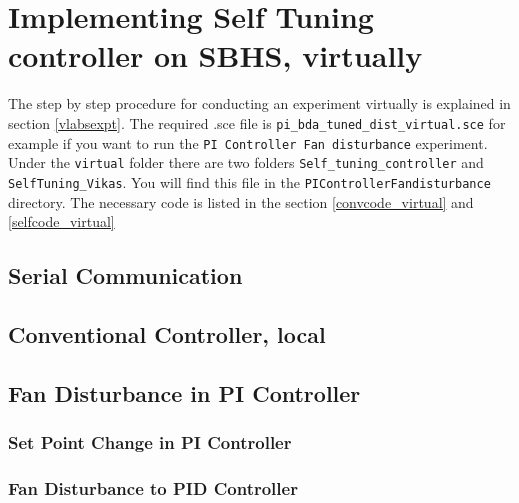 \section{Implementing Self Tuning controller on SBHS, virtually}
The step by step procedure for conducting an experiment virtually is explained in section \ref{vlabsexpt}. The required .sce file is {\tt pi\_bda\_tuned\_dist\_virtual.sce} for example if you want to run the {\tt PI Controller Fan disturbance} experiment.  Under the {\tt virtual} folder there are two folders {\tt Self\_tuning\_controller} and {\tt SelfTuning\_Vikas}. You will find this file in the {\tt PIControllerFandisturbance} directory. The necessary code is listed in the section \ref{convcode_virtual} and \ref{selfcode_virtual}


\subsection{Serial Communication}
\begin{code}

\end{code}


\subsection{Conventional Controller, local}\label{convcode_local}
\subsection{Fan Disturbance in PI Controller}
\begin{code}

\end{code}


\subsubsection{Set Point Change in PI Controller}
\begin{code}

\end{code}



\subsubsection{Fan Disturbance to PID Controller}
\begin{code}

\end{code}


